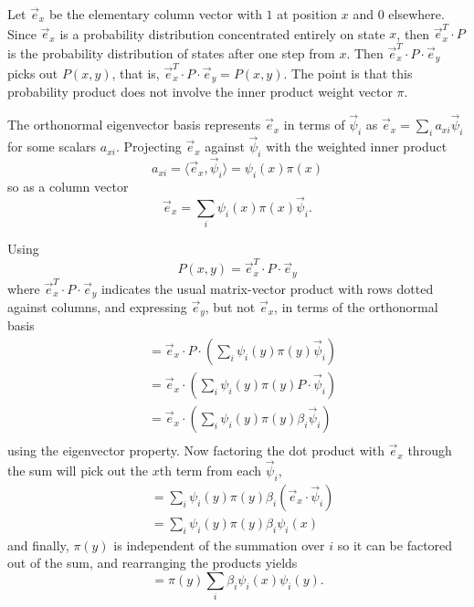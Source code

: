 \documentclass[12pt]{article}
\begin{document}
\begin{solution}
    Let \( \vec{e}_x \) be the elementary column vector with \( 1 \) at
    position \( x \) and \( 0 \) elsewhere.  Since \( \vec{e}_x \) is a
    probability distribution concentrated entirely on state \( x \),
    then \( \vec{e}^T_x \cdot P \) is the probability distribution of
    states after one step from \( x \).  Then \( \vec{e}^T_x \cdot P
    \cdot \vec{e}_y \) picks out \( P(x,y) \), that is, \( \vec{e}^T_x
    \cdot P \cdot \vec{e}_y = P(x,y) \).  The point is that this
    probability product does not involve the inner product weight vector
    \( \pi \).

    The orthonormal eigenvector basis represents \( \vec{e}_x \) in
    terms of \( \vec{\psi}_i \) as \( \vec{e}_x = \sum_i a_{xi} \vec{\psi}_i
    \) for some scalars \( a_{xi} \).  Projecting \( \vec{e}_x \)
    against \( \vec{\psi}_i \) with the weighted inner product
    \[
        a_{xi} = \langle \vec{e}_{x}, \vec{\psi}_{i} \rangle = \psi_i(x)
        \pi(x)
    \] so as a column vector
    \[
        \vec{e}_x =\sum\limits_i \psi_i(x) \pi(x) \vec{\psi}_i.
    \]

    Using
    \[
        P(x,y) = \vec{e}^T_x \cdot P \cdot \vec{e}_y
    \] where \( \vec{e}^T_x \cdot P \cdot \vec{e}_y \) indicates the
    usual matrix-vector product with rows dotted against columns, and
    expressing \( \vec{e}_y \), but not \( \vec{e}_x \), in terms of the
    orthonormal basis
    \begin{align*}
        & = \vec{e}_x \cdot P \cdot \left( \sum\limits_i \psi_i(y) \pi(y)
        \vec{\psi}_i \right) \\
        & = \vec{e}_x \cdot \left( \sum\limits_i \psi_i(y) \pi(y) P
        \cdot \vec{\psi}_i \right) \\
        &= \vec{e}_x \cdot \left( \sum\limits_i \psi_i(y) \pi(y) \beta_i
        \vec{\psi}_i \right) \\
    \end{align*}
    using the eigenvector property.  Now factoring the dot product with \(
    \vec{e}_x \) through the sum will pick out the \( x \)th term from
    each \( \vec{\psi}_i \),
    \begin{align*}
        &= \sum\limits_i \psi_i(y) \pi(y) \beta_i \left( \vec{e}_x \cdot
        \vec{\psi}_i \right) \\
        & = \sum\limits_i \psi_i(y) \pi(y) \beta_i \psi_i(x)
    \end{align*}
    and finally, \( \pi(y) \) is independent of the summation over \( i \)
    so it can be factored out of the sum, and rearranging the products
    yields
    \[
        = \pi(y) \sum\limits_i \beta_i \psi_i(x) \psi_i(y).
    \]
\end{solution}
\end{document}
